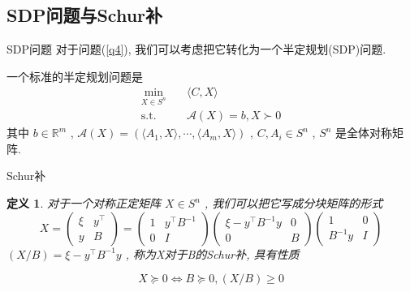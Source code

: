 \documentclass[slidestop,compress,mathserif,UTF8]{beamer}
\newtheorem{define}{\bf \textcolor[rgb]{0.8,0,0}{定义}}[section]
\numberwithin{equation}{section}                                %
\begin{document}
        \subsection{SDP问题与Schur补}
            \begin{frame}[t]{SDP问题}
                对于问题(\ref{q4}), 我们可以考虑把它转化为一个半定规划(SDP)问题.

                一个标准的半定规划问题是
                \begin{equation}
                    \begin{split}\label{SDP}
                        \min_{X \in S^n} \quad
                            & \langle{C, X}\rangle\\
                        \text{s.t.} \quad
                            & \mathcal{A}(X) = b, X \succ 0
                    \end{split}
                \end{equation}
                \small{其中 $b \in \mathbb{R}^{m}$ , $\mathcal{A}(X) = (\langle{A_1, X}\rangle, \cdots, \langle{A_m, X}\rangle)$ , $C, A_i \in S^n$ , $S^n$ 是全体对称矩阵.}\normalsize
            \end{frame}
            \begin{frame}[t]{Schur补}
                \begin{define}
                    对于一个对称正定矩阵 $X \in S^n$ , 我们可以把它写成分块矩阵的形式
                    \begin{equation}
                            X
                        =	\begin{pmatrix}
                                \xi & y^\top \\
                                y & B
                            \end{pmatrix}
                        =	\begin{pmatrix}
                                1 & y^\top B^{-1} \\
                                0 & I
                            \end{pmatrix}
                            \begin{pmatrix}
                                \xi - y^\top B^{-1} y & 0 \\
                                0 & B
                            \end{pmatrix}
                            \begin{pmatrix}
                                1 & 0 \\
                                B^{-1} y & I
                            \end{pmatrix}
                    \end{equation}
                    $(X/B) = \xi - y^\top B^{-1} y$ , 称为X对于B的Schur补, 具有性质

                    \begin{equation}\label{SchurCondition}
                        X \succeq 0 \Leftrightarrow B \succeq 0, (X/B) \geq 0
                    \end{equation}
                \end{define}
            \end{frame}
\end{document}
